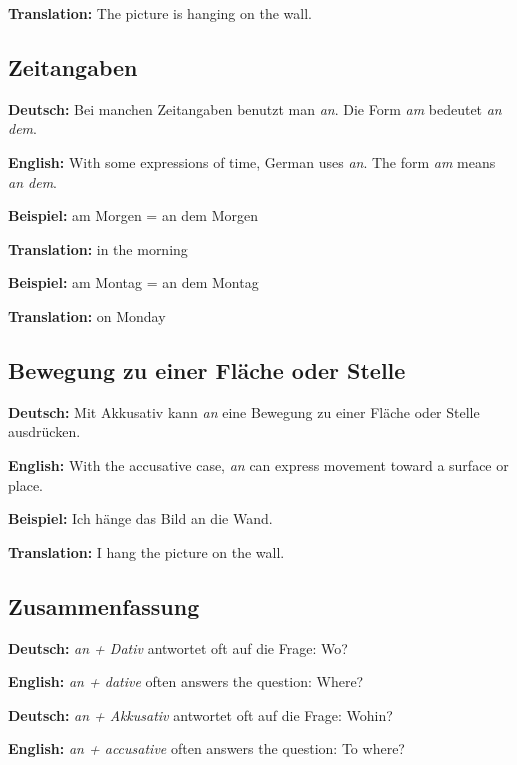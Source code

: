 \documentclass[a4paper]{article}
\begin{document}
            \textbf{Translation:} The picture is hanging on the wall.
        
        \subsection{Zeitangaben}
            
            \textbf{Deutsch:} Bei manchen Zeitangaben benutzt man \textit{an}. Die Form \textit{am} bedeutet \textit{an dem}.
            
            \textbf{English:} With some expressions of time, German uses \textit{an}. The form \textit{am} means \textit{an dem}.
            
            \textbf{Beispiel:} am Morgen = an dem Morgen
            
            \textbf{Translation:} in the morning
            
            \textbf{Beispiel:} am Montag = an dem Montag
            
            \textbf{Translation:} on Monday
        
        \subsection{Bewegung zu einer Fläche oder Stelle}
            
            \textbf{Deutsch:} Mit Akkusativ kann \textit{an} eine Bewegung zu einer Fläche oder Stelle ausdrücken.
            
            \textbf{English:} With the accusative case, \textit{an} can express movement toward a surface or place.
            
            \textbf{Beispiel:} Ich hänge das Bild an die Wand.
            
            \textbf{Translation:} I hang the picture on the wall.
        
        \subsection{Zusammenfassung}
            
            \textbf{Deutsch:} \textit{an + Dativ} antwortet oft auf die Frage: Wo?
            
            \textbf{English:} \textit{an + dative} often answers the question: Where?
            
            \textbf{Deutsch:} \textit{an + Akkusativ} antwortet oft auf die Frage: Wohin?
            
            \textbf{English:} \textit{an + accusative} often answers the question: To where?

%            
%            
\end{document}
